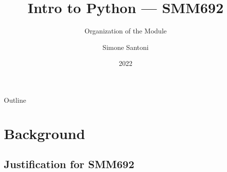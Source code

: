 \documentclass[aspectratio=1610]{beamer}
\title{Intro to Python --- SMM692}
\subtitle{Organization of the Module}
\author{Simone Santoni}
\institute{Bayes Business School}
\date{2022}
\begin{document}
\begin{frame}
	\titlepage
\end{frame}

\begin{frame}{Outline}
	\tableofcontents
\end{frame}


\section{Background}

\subsection{Justification for SMM692}
\end{document}
